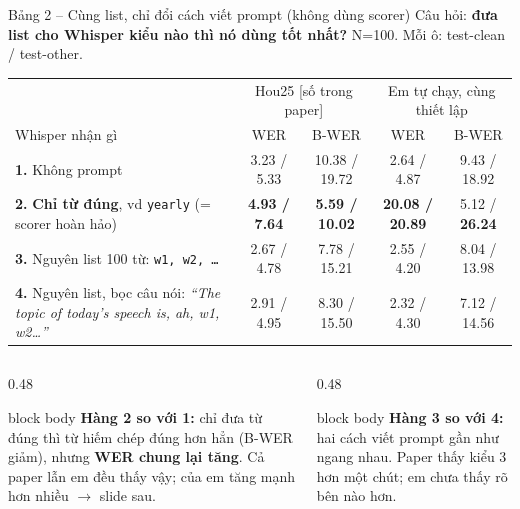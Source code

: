\documentclass[aspectratio=169,xcolor=table]{beamer}
\newcommand{\bad}[1]{\textcolor{RiskRed}{\textbf{#1}}}
\newcommand{\good}[1]{\textcolor{GoodGreen}{\textbf{#1}}}
\newcommand{\src}[1]{{\tiny\color{TextGray}[#1]}}
\newcommand{\ra}{$\rightarrow$}
\begin{document}
\begin{frame}{Bảng 2 -- Cùng list, chỉ đổi cách viết prompt (không dùng scorer)}
{\small Câu hỏi: \textbf{đưa list cho Whisper kiểu nào thì nó dùng tốt nhất?} N=100. Mỗi ô: test-clean / test-other.}\par\vspace{0.15cm}
\centering\footnotesize\setlength{\tabcolsep}{4pt}
\begin{tabular}{p{5.3cm}cc|cc}
\toprule
 & \multicolumn{2}{c|}{Hou25 \src{số trong paper}} & \multicolumn{2}{c}{Em tự chạy, cùng thiết lập}\\
Whisper nhận gì & WER & B-WER & WER & B-WER\\
\midrule
\textbf{1.} Không prompt & 3.23 / 5.33 & 10.38 / 19.72 & 2.64 / 4.87 & 9.43 / 18.92\\
\textbf{2.} \textbf{Chỉ từ đúng}, vd \texttt{yearly} \;(= scorer hoàn hảo) & \bad{4.93 / 7.64} & \good{5.59 / 10.02} & \bad{20.08 / 20.89} & 5.12 / \bad{26.24}\\
\textbf{3.} Nguyên list 100 từ: \texttt{w1, w2, \ldots} & 2.67 / 4.78 & 7.78 / 15.21 & 2.55 / 4.20 & 8.04 / 13.98\\
\textbf{4.} Nguyên list, bọc câu nói: \textit{``The topic of today's speech is, ah, w1, w2\ldots''} & 2.91 / 4.95 & 8.30 / 15.50 & 2.32 / 4.30 & 7.12 / 14.56\\
\bottomrule
\end{tabular}
\raggedright\vspace{0.25cm}
\begin{columns}[T]
\begin{column}{0.48\textwidth}
\begin{beamercolorbox}[sep=0.45em,rounded=true]{block body}
\footnotesize\textbf{Hàng 2 so với 1:} chỉ đưa từ đúng thì từ hiếm chép đúng hơn hẳn (B-WER giảm), nhưng \textbf{WER chung lại tăng}. Cả paper lẫn em đều thấy vậy; của em tăng mạnh hơn nhiều \ra{} slide sau.
\end{beamercolorbox}
\end{column}
\begin{column}{0.48\textwidth}
\begin{beamercolorbox}[sep=0.45em,rounded=true]{block body}
\footnotesize\textbf{Hàng 3 so với 4:} hai cách viết prompt gần như ngang nhau. Paper thấy kiểu 3 hơn một chút; em chưa thấy rõ bên nào hơn.
\end{beamercolorbox}
\end{column}
\end{columns}
\end{frame}
\end{document}
